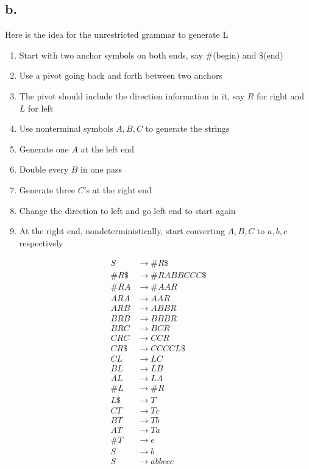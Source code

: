 \documentclass[12pt]{article}
\begin{document}
\subsection*{b.}
Here is the idea for the unrestricted grammar to generate L
\begin{enumerate}
    \item Start with two anchor symbols on both ends, say $\#$(begin) and $\$$(end)
    \item Use a pivot going back and forth between two anchors
    \item The pivot should include the direction information in it, say $R$ for right and $L$ for left
    \item Use nonterminal symbols $A,B,C$ to generate the strings
    \item Generate one $A$  at the left end
    \item Double every $B$ in one pass
    \item Generate three $C$'s at the right end
    \item Change the direction to left and go left end to start again
    \item At the right end, nondeterministically, start converting $A,B,C$ to $a,b,c$ respectively
\end{enumerate}
\begin{align*}
    S &\rightarrow \#R\$\\
    \#R\$ &\rightarrow \#RABBCCC\$\\
    \#RA &\rightarrow \#AAR\\
    ARA &\rightarrow AAR\\
    ARB &\rightarrow ABBR\\
    BRB &\rightarrow BBBR\\
    BRC &\rightarrow BCR\\
    CRC &\rightarrow CCR\\
    CR\$ &\rightarrow CCCCL\$\\
    CL &\rightarrow LC\\
    BL &\rightarrow LB\\
    AL &\rightarrow LA\\
    \#L &\rightarrow \#R\\
    L\$ &\rightarrow T\\
    CT &\rightarrow Tc\\
    BT &\rightarrow Tb\\
    AT &\rightarrow Ta\\
    \#T &\rightarrow e\\
    S  &\rightarrow b\\
    S &\rightarrow abbccc
\end{align*}
\end{document}
